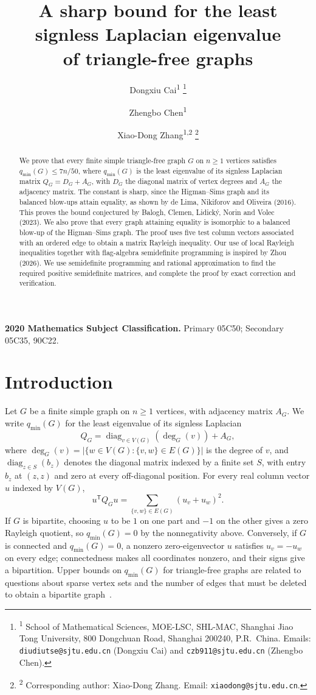 \documentclass[11pt]{article}
\title{A sharp bound for the least signless Laplacian eigenvalue\\of triangle-free graphs}
\author{Dongxiu Cai\textsuperscript{1}%
\thanks{\textsuperscript{1} School of Mathematical Sciences, MOE-LSC,
SHL-MAC, Shanghai Jiao Tong University, 800 Dongchuan Road,
Shanghai 200240, P.R.~China. Emails:
\texttt{diudiutse@sjtu.edu.cn} (Dongxiu Cai) and
\texttt{czb911@sjtu.edu.cn} (Zhengbo Chen).}
\and Zhengbo Chen\textsuperscript{1}
\and Xiao-Dong Zhang\textsuperscript{1,2}%
\thanks{\textsuperscript{2} Corresponding author: Xiao-Dong Zhang.
Email: \texttt{xiaodong@sjtu.edu.cn}.}}
\date{}
\newcommand{\qmin}{q_{\min}}
\begin{document}
\begingroup
\makeatletter
\let\@fnsymbol\@gobble
\makeatother
\maketitle
\endgroup
\begin{abstract}
We prove that every finite simple triangle-free graph $G$ on $n\geq1$ vertices
satisfies $\qmin(G)\leq7n/50$, where $\qmin(G)$ is the least eigenvalue
of its signless Laplacian matrix $Q_G=D_G+A_G$, with $D_G$ the diagonal
matrix of vertex degrees and $A_G$ the adjacency matrix. The constant is sharp, since the Higman--Sims graph
and its balanced blow-ups attain equality, as shown by de Lima, Nikiforov
and Oliveira (2016). This proves the bound
conjectured by Balogh, Clemen, Lidick\'y, Norin and Volec
(2023). We also prove that every graph attaining equality is isomorphic
to a balanced blow-up of the Higman--Sims graph. The proof uses five test column vectors associated
with an ordered edge to obtain a matrix Rayleigh inequality. Our use of
local Rayleigh inequalities together with flag-algebra semidefinite
programming is inspired by Zhou (2026). We use semidefinite
programming and rational approximation to find the required positive
semidefinite matrices, and complete the proof by exact correction and
verification.
\end{abstract}

\noindent\textbf{2020 Mathematics Subject Classification.}
Primary 05C50; Secondary 05C35, 90C22.

\section{Introduction}\label{sec:introduction}

Let $G$ be a finite simple graph on $n\geq1$ vertices, with adjacency
matrix $A_G$. We write $\qmin(G)$ for the least eigenvalue of its signless
Laplacian
\[
Q_G=\operatorname{diag}_{v\in V(G)}(\deg_G(v))+A_G,
\]
where $\deg_G(v)=|\{w\in V(G):\{v,w\}\in E(G)\}|$ is the degree of $v$,
and $\operatorname{diag}_{z\in S}(b_z)$ denotes the diagonal matrix indexed
by a finite set $S$, with entry $b_z$ at $(z,z)$ and zero at every off-diagonal position.
For every real column vector $u$ indexed by $V(G)$,
\[
u^{\mathsf T}
Q_Gu
=\sum_{\{v,w\}\in E(G)}(u_v+u_w)^2.
\]
If $G$ is bipartite, choosing $u$ to be $1$ on one part and $-1$ on the
other gives a zero Rayleigh quotient, so $\qmin(G)=0$ by the nonnegativity
above.
Conversely, if $G$ is connected and $\qmin(G)=0$, a nonzero zero-eigenvector $u$
satisfies $u_v=-u_w$ on every edge; connectedness makes all coordinates
nonzero, and their signs give a bipartition.
Upper bounds on
$\qmin(G)$ for triangle-free graphs are related to questions about sparse
vertex sets and the number of edges that must be deleted to obtain a
bipartite graph~\cite{BCLNV,Brandt}.
\end{document}
